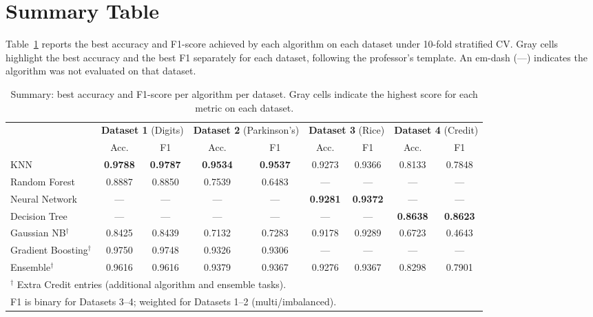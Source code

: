 \documentclass[11pt,letterpaper]{article}
\begin{document}
\section{Summary Table}

Table~\ref{tab:summary} reports the best accuracy and F1-score achieved by
each algorithm on each dataset under 10-fold stratified CV.  Gray cells
highlight the best accuracy and the best F1 separately for each dataset,
following the professor's template.  An em-dash (---) indicates the algorithm
was not evaluated on that dataset.

\begin{table}[H]
\centering
\caption{Summary: best accuracy and F1-score per algorithm per dataset.
         Gray cells indicate the highest score for each metric on each dataset.}
\label{tab:summary}
\renewcommand{\arraystretch}{1.3}
\setlength{\tabcolsep}{5pt}
\begin{tabular}{lcccccccc}
\toprule
& \multicolumn{2}{c}{\textbf{Dataset 1} (Digits)}
& \multicolumn{2}{c}{\textbf{Dataset 2} (Parkinson's)}
& \multicolumn{2}{c}{\textbf{Dataset 3} (Rice)}
& \multicolumn{2}{c}{\textbf{Dataset 4} (Credit)} \\
\cmidrule(lr){2-3}\cmidrule(lr){4-5}\cmidrule(lr){6-7}\cmidrule(lr){8-9}
& Acc. & F1 & Acc. & F1 & Acc. & F1 & Acc. & F1 \\
\midrule
KNN
  & \cellcolor{hilight}\textbf{0.9788}
  & \cellcolor{hilight}\textbf{0.9787}
  & \cellcolor{hilight}\textbf{0.9534}
  & \cellcolor{hilight}\textbf{0.9537}
  & 0.9273 & 0.9366
  & 0.8133 & 0.7848 \\
Random Forest
  & 0.8887 & 0.8850
  & 0.7539 & 0.6483
  & --- & ---
  & --- & --- \\
Neural Network
  & --- & ---
  & --- & ---
  & \cellcolor{hilight}\textbf{0.9281}
  & \cellcolor{hilight}\textbf{0.9372}
  & --- & --- \\
Decision Tree
  & --- & ---
  & --- & ---
  & --- & ---
  & \cellcolor{hilight}\textbf{0.8638}
  & \cellcolor{hilight}\textbf{0.8623} \\
Gaussian NB$^\dagger$
  & 0.8425 & 0.8439
  & 0.7132 & 0.7283
  & 0.9178 & 0.9289
  & 0.6723 & 0.4643 \\
Gradient Boosting$^\dagger$
  & 0.9750 & 0.9748
  & 0.9326 & 0.9306
  & --- & ---
  & --- & --- \\
Ensemble$^\dagger$
  & 0.9616 & 0.9616
  & 0.9379 & 0.9367
  & 0.9276 & 0.9367
  & 0.8298 & 0.7901 \\
\bottomrule
\multicolumn{9}{l}{%
  $^\dagger$ Extra Credit entries (additional algorithm and ensemble tasks).}\\
\multicolumn{9}{l}{%
  F1 is binary for Datasets 3--4; weighted for Datasets 1--2 (multi/imbalanced).}
\end{tabular}
\end{table}
\end{document}
